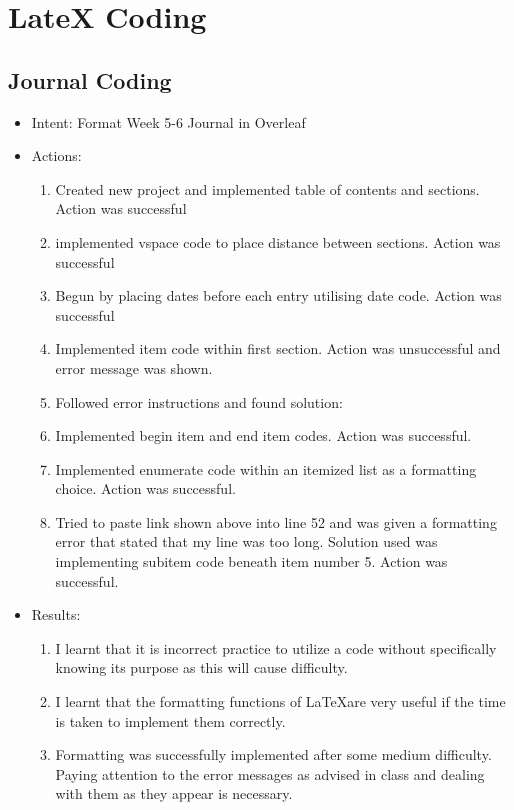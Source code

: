 \documentclass{article}
\begin{document}
\section{LateX Coding}
\subsection{Journal Coding}
\date{27/8/2019 12:52}
\begin{itemize}
\item{Intent: Format Week 5-6 Journal in Overleaf}
\item{Actions:}
\begin{enumerate}
    \item{Created new project and implemented table of contents and sections. Action was successful}
    \item{implemented vspace code to place distance between sections. Action was successful}
    \item{Begun by placing dates before each entry utilising date code. Action was successful}
    \item{Implemented item code within first section. Action was unsuccessful and error message was shown.}
    \item{Followed error instructions and found solution:}
    \item{Implemented begin item and end item codes. Action was successful.}
    \item{Implemented enumerate code within an itemized list as a formatting choice. Action was successful.}
    \item{Tried to paste link shown above into line 52 and was given a formatting error that stated that my line was too long. Solution used was implementing subitem code beneath item number 5. Action was successful.}
    \end{enumerate}
\item{Results:}
\begin{enumerate}
    \item{I learnt that it is incorrect practice to utilize a code without specifically knowing its purpose as this will cause difficulty.}
    \item{I learnt that the formatting functions of \LaTeX are very useful if the time is taken to implement them correctly.}
    \item{Formatting was successfully implemented after some medium difficulty. Paying attention to the error messages as advised in class and dealing with them as they appear is necessary.}
\end{enumerate}
\end{itemize}
\end{document}
